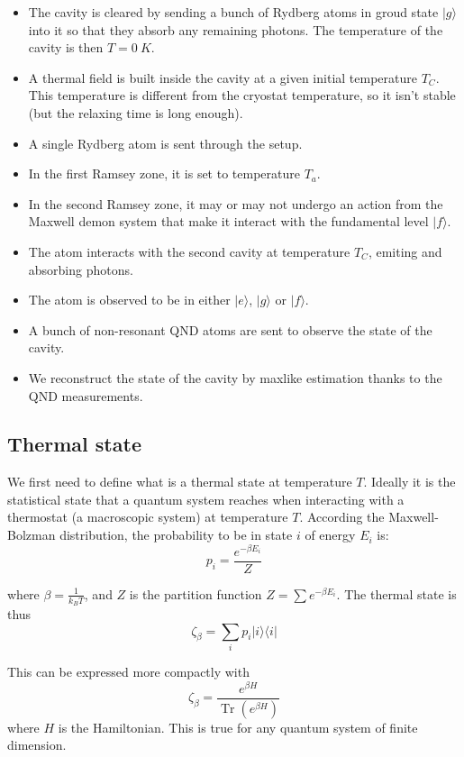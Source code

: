 \documentclass[10pt,a4paper]{report}
\theoremstyle{plain}
\theoremstyle{definition}
\theoremstyle{remark}
\newcommand{\ket}[1]{|#1\rangle}
\newcommand{\bra}[1]{\langle#1|}
\DeclareMathOperator{\Tr}{Tr}
\newcommand{\trnorm}[1]{\frac{#1}{\Tr\left({#1}\right)}}
\begin{document}
\begin{itemize}
\item The cavity is cleared by sending a bunch of Rydberg atoms in groud state
  $\ket g$ into it so that they absorb any remaining photons. The temperature of
  the cavity is then $T = \SI{0}{K}$.
\item A thermal field is built inside the cavity at a given initial temperature
  $T_C$. This temperature is different from the cryostat temperature, so it
  isn't stable (but the relaxing time is long enough).
\item A single Rydberg atom is sent through the setup.
\item In the first Ramsey zone, it is set to temperature $T_a$.
\item In the second Ramsey zone, it may or may not undergo an action from the Maxwell
  demon system that make it interact with the fundamental level $\ket f$.
\item The atom interacts with the second cavity at temperature $T_C$, emiting
  and absorbing photons.
\item The atom is observed to be in either $\ket e$, $\ket g$ or $\ket f$.
\item A bunch of non-resonant QND atoms are sent to observe the state of the cavity.
\item We reconstruct the state of the cavity by maxlike estimation thanks to
  the QND measurements.
\end{itemize}

\subsection{Thermal state}

We first need to define what is a thermal state at temperature $T$. Ideally it
is the statistical state that
a quantum system reaches when interacting with a thermostat
(a macroscopic system) at temperature $T$. According the Maxwell-Bolzman
distribution, the probability to be in state $i$ of energy $E_i$ is:
\[p_i = \frac {e^{-\beta E_i}} Z\]

where $\beta = \frac 1 {k_B T}$, and $Z$ is the partition function $Z = \sum
e^{-\beta E_i}$. The thermal state is thus
\[\zeta_\beta = \sum_i p_i \ket i \bra i\]

This can be expressed more compactly with
\begin{equation}
  \zeta_\beta = \trnorm{e^{\beta H}}
\end{equation}
where $H$ is the Hamiltonian. This is true for any quantum system of finite dimension.
\end{document}
